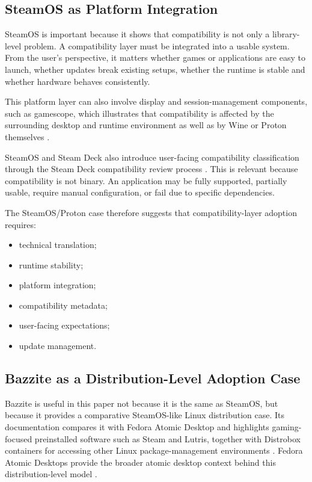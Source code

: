 \documentclass[conference]{IEEEtran}
\begin{document}
\subsection{SteamOS as Platform Integration}

SteamOS is important because it shows that compatibility is not only a library-level problem. A compatibility layer must be integrated into a usable system. From the user's perspective, it matters whether games or applications are easy to launch, whether updates break existing setups, whether the runtime is stable and whether hardware behaves consistently.

This platform layer can also involve display and session-management components, such as gamescope, which illustrates that compatibility is affected by the surrounding desktop and runtime environment as well as by Wine or Proton themselves \cite{gamescope}.

SteamOS and Steam Deck also introduce user-facing compatibility classification through the Steam Deck compatibility review process \cite{steamDeckCompatibility}. This is relevant because compatibility is not binary. An application may be fully supported, partially usable, require manual configuration, or fail due to specific dependencies.

The SteamOS/Proton case therefore suggests that compatibility-layer adoption requires:
\begin{itemize}
    \item technical translation;
    \item runtime stability;
    \item platform integration;
    \item compatibility metadata;
    \item user-facing expectations;
    \item update management.
\end{itemize}

\subsection{Bazzite as a Distribution-Level Adoption Case}

Bazzite is useful in this paper not because it is the same as SteamOS, but because it provides a comparative SteamOS-like Linux distribution case. Its documentation compares it with Fedora Atomic Desktop and highlights gaming-focused preinstalled software such as Steam and Lutris, together with Distrobox containers for accessing other Linux package-management environments \cite{bazziteFedoraAtomicComparison,bazziteGamingIntro}. Fedora Atomic Desktops provide the broader atomic desktop context behind this distribution-level model \cite{fedoraAtomicDesktops}.
\end{document}
